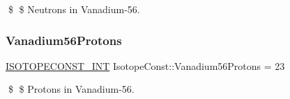 \$ \$ Neutrons in Vanadium-\/56. \mbox{\label{group___isotope_const-_vanadium-_v56_gaecdc31807c041fb4bf9c91450fb6db36}} 
\subsubsection{\texorpdfstring{Vanadium56\+Protons}{Vanadium56Protons}}
{\footnotesize\ttfamily \mbox{\hyperlink{group___isotope_const-_macros_ga5f18360b3e99483a35c32d789e62621c}{I\+S\+O\+T\+O\+P\+E\+C\+O\+N\+S\+T\+\_\+\+I\+NT}} Isotope\+Const\+::\+Vanadium56\+Protons = 23}

\$ \$ Protons in Vanadium-\/56. 